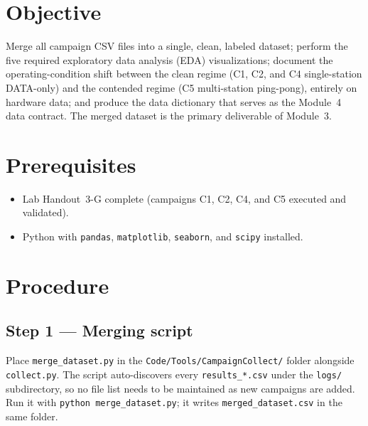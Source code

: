 \documentclass[11pt,letterpaper]{article}
\begin{document}

\section{Objective}
Merge all campaign \mbox{CSV} files into a single, clean, labeled dataset; perform the five required exploratory data analysis (\mbox{EDA}) visualizations; document the operating-condition shift between the clean regime (C1, C2, and C4 single-station DATA-only) and the contended regime (C5 multi-station ping-pong), entirely on hardware data; and produce the data dictionary that serves as the Module~4 data contract. The merged dataset is the primary deliverable of Module~3.

\section{Prerequisites}
\begin{itemize}[leftmargin=2em]
	\item Lab Handout~3-G complete (campaigns C1, C2, C4, and C5 executed and validated).
	\item Python with \texttt{pandas}, \texttt{matplotlib}, \texttt{seaborn}, and \texttt{scipy} installed.
\end{itemize}

\section{Procedure}

\subsection{Step 1 --- Merging script}
Place \texttt{merge\_dataset.py} in the \texttt{Code/Tools/CampaignCollect/} folder alongside \texttt{collect.py}. The script auto-discovers every \texttt{results\_*.csv} under the \texttt{logs/} subdirectory, so no file list needs to be maintained as new campaigns are added. Run it with \texttt{python merge\_dataset.py}; it writes \texttt{merged\_dataset.csv} in the same folder.
\end{document}
